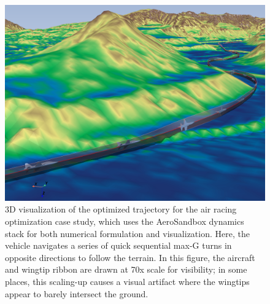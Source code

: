 \begin{figure}[H]
    \centering
    \includegraphics[width=\textwidth]{../figures/air-racing/2.png}
    \caption{3D visualization of the optimized trajectory for the air racing optimization case study, which uses the AeroSandbox dynamics stack for both numerical formulation and visualization. Here, the vehicle navigates a series of quick sequential max-G turns in opposite directions to follow the terrain. In this figure, the aircraft and wingtip ribbon are drawn at 70x scale for visibility; in some places, this scaling-up causes a visual artifact where the wingtips appear to barely intersect the ground.}
    \label{fig:air-racing-2}
\end{figure}

